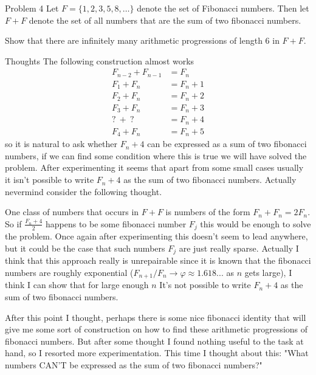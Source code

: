 \documentclass{article}
\begin{document}
\begin{problem}{Problem 4}
Let $F = \{ 1,2,3,5,8, \ldots \}$ denote the set of Fibonacci numbers.
Then let $F + F$ denote the set of all numbers that are the sum of two
fibonacci numbers.
\vspace{0.2cm}

Show that there are infinitely many arithmetic progressions of length 6
in $F + F$.
\end{problem}

\begin{hint}{Thoughts}
The following construction almost works
\[
\begin{aligned}
F_{n-2} + F_{n-1} &= F_n \\
F_1 + F_n &= F_n + 1 \\
F_2 + F_n &= F_n + 2 \\
F_3 + F_n &= F_n + 3 \\
? \ + \ ? &= F_n + 4 \\
F_4 + F_n &= F_n + 5
\end{aligned}
\]
so it is natural to ask whether $F_n + 4$ can be expressed as a sum of
two fibonacci numbers, if we can find some condition where this is true
we will have solved the problem. After experimenting it seems that apart
from some small cases usually it isn't possible to write $F_n + 4$ as
the sum of two fibonacci numbers. Actually nevermind
consider the following thought.
\vspace{0.2cm}

One class of numbers that occurs in $F + F$ is numbers of the form
$F_n + F_n = 2F_n$. So if $\frac{F_n + 4}{2}$ happens to be some fibonacci
number $F_j$ this would be enough to solve the problem. Once again
after experimenting this doesn't seem to lead anywhere, but it could be
the case that such numbers $F_j$ are just really sparse. Actually I think
that this approach really is unrepairable since it is known that
the fibonacci numbers are roughly exponential ($F_{n+1} / F_n \rightarrow
\varphi \approx 1.618...$ as $n$ gets large),
I think I can show that for large enough $n$
It's not possible to write $F_n + 4$ as the sum of two fibonacci numbers.
\vspace{0.2cm}

After this point I thought, perhaps there is some nice fibonacci identity
that will give me some sort of construction on how to find these
arithmetic progressions of fibonacci numbers. But after some thought I
found nothing useful to the task at hand, so I resorted more
experimentation. This time I thought about this: "What numbers CAN'T be
expressed as the sum of two fibonacci numbers?"


\end{hint}
\end{document}
